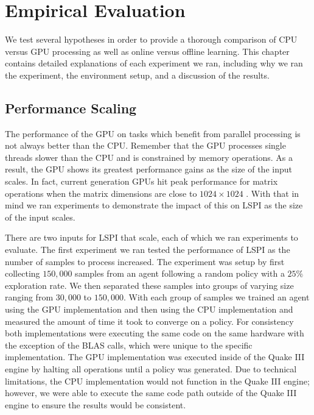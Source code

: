 \chapter{Empirical Evaluation}
\label{chap:evaluation}

We test several hypotheses in order to provide a thorough comparison of CPU versus GPU processing as well as online versus offline learning. This chapter contains detailed explanations of each experiment we ran, including why we ran the experiment, the environment setup, and a discussion of the results.

\section{Performance Scaling}

The performance of the GPU on tasks which benefit from parallel processing is not always better than the CPU. Remember that the GPU processes single threads slower than the CPU and is constrained by memory operations. As a result, the GPU shows its greatest performance gains as the size of the input scales. In fact, current generation GPUs hit peak performance for matrix operations when the matrix dimensions are close to $1024 \times 1024$ \cite{cuda:perf}. With that in mind we ran experiments to demonstrate the impact of this on LSPI as the size of the input scales.

There are two inputs for LSPI that scale, each of which we ran experiments to evaluate. The first experiment we ran tested the performance of LSPI as the number of samples to process increased. The experiment was setup by first collecting $150,000$ samples from an agent following a random policy with a $25\%$ exploration rate. We then separated these samples into groups of varying size ranging from $30,000$ to $150,000$. With each group of samples we trained an agent using the GPU implementation and then using the CPU implementation and measured the amount of time it took to converge on a policy. For consistency both implementations were executing the same code on the same hardware with the exception of the BLAS calls, which were unique to the specific implementation. The GPU implementation was executed inside of the Quake III engine by halting all operations until a policy was generated. Due to technical limitations, the CPU implementation would not function in the Quake III engine; however, we were able to execute the same code path outside of the Quake III engine to ensure the results would be consistent.

